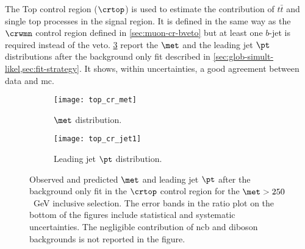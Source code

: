 The Top control region ($\crtop$) is used to estimate the contribution of
$t \bar{t}$ and single top processes in the signal region. It is defined in the
same way as the $\crwmn$ control region defined in \cref{sec:muon-cr-bveto} but
at least one $b$-jet is required instead of the veto. \cref{fig:top_plots}
report the $\met$ and the leading jet $\pt$ distributions after the background
only fit described in \cref{sec:glob-simult-likel,sec:fit-strategy}. It shows,
within uncertainties, a good agreement between data and \gls{mc}.
\begin{figure}[!th]
  \centering
  \begin{subfigure}[t]{.48\linewidth}
    \texttt{[image: top\_cr\_met]}
    \caption{$\met$ distribution.}
    \label{fig:top_cr_et_miss}
  \end{subfigure}
  \begin{subfigure}[t]{.48\linewidth}
    \texttt{[image: top\_cr\_jet1]}
    \caption{Leading jet $\pt$ distribution.}
    \label{fig:top_cr_jet1}
  \end{subfigure}
  \caption{Observed and predicted $\met$ and leading jet $\pt$ after the
    background only fit in the $\crtop$ control region for the $\met > 250$~GeV
    inclusive selection. The error bands in the ratio plot on the bottom of the
    figures include statistical and systematic uncertainties. The negligible
    contribution of \gls{ncb} and diboson backgrounds is not reported in the
    figure.}
  \label{fig:top_plots}
\end{figure}
